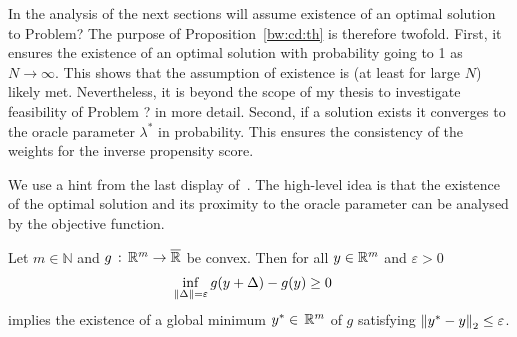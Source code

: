 \begin{remark}
  In the analysis of the next sections will assume existence of an optimal solution to Problem?
  The purpose of Proposition~\ref{bw:cd:th} is therefore twofold. 
  First, it ensures the existence of an optimal solution with probability going to 1 as $N\to\infty$.
  This shows that the assumption of existence is (at least for large $N$) likely met.
  Nevertheless, it is beyond the scope of my thesis to investigate feasibility of Problem ? in more detail. 
  Second, if a solution exists it converges to the oracle parameter $\lambda^*$ in probability. This ensures the consistency of the weights for the inverse propensity score.
\end{remark}

We use a hint from the last display of~\cite[p.22]{Wang2019}.
The high-level idea is that the existence of the optimal solution and its proximity to the oracle parameter can be analysed by the objective function.
\begin{lemma}
  \label{bw:cd:lem}
  Let $m\in\mathbb{N}$ and
  $g \,:\, \mathbb{R}^m \to \overline{\mathbb{R}}$ 
  be convex.
  Then 
  for all $y \in \mathbb{R}^m$ and $\varepsilon>0$ 
    \begin{gather}
      \label{7060_0}
      \inf_{\left\lVert\Delta\right\rVert=\varepsilon} g(y+\Delta) - g(y) \ge 0 \quad
    \end{gather}
    implies
    the existence of  
    a global minimum
    $
    y^* \in \,\mathbb{R}^m
    $
    of $g$
    satisfying
    $
      \left\lVert y^* - y\right\rVert_2 \le \varepsilon
    $.
\end{lemma}
